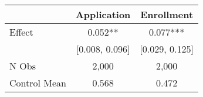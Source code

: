 \begin{tabular}{lcc}
\hline
                      & \textbf{Application}     & \textbf{Enrollment}\\ \hline
Effect &      0.052**      &         0.077***             \\
                      & [0.008, 0.096]  &[0.029, 0.125] \\ \hline
N Obs & 2,000 & 2,000 \\
Control Mean & 0.568 & 0.472\\ \hline
\end{tabular}
